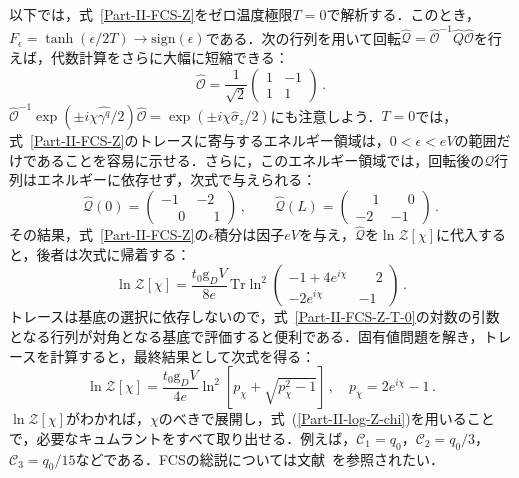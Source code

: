 \documentclass[a4paper,11pt]{ltjsarticle}
\def\Tr{\mathrm{Tr}}
\begin{document}
以下では，式~\eqref{Part-II-FCS-Z}をゼロ温度極限$T=0$で解析する．このとき，$F_{\epsilon}=\tanh(\epsilon/2T)\to \mbox{sign}(\epsilon)$である．次の行列を用いて回転$\hat{\mathcal{Q}}=\hat{\mathcal{O}}^{-1}\hat{Q}\hat{\mathcal{O}}$を行えば，代数計算をさらに大幅に短縮できる：
\begin{equation}
\hat{\mathcal{O}}=\frac{1}{\sqrt{2}}\left(\begin{array}{cr}1 & -1
\\ 1 & 1\end{array}\right)\,.
\end{equation}
$\hat{\mathcal{O}}^{-1}\exp(\pm
i\chi\hat{\gamma^{q}}/2)\hat{\mathcal{O}}=\exp(\pm
i\chi\hat{\sigma}_{z}/2)$にも注意しよう．$T=0$では，式~\eqref{Part-II-FCS-Z}のトレースに寄与するエネルギー領域は，$0<\epsilon<eV$の範囲だけであることを容易に示せる．さらに，このエネルギー領域では，回転後の$\mathcal{Q}$行列はエネルギーに依存せず，次式で与えられる：
\begin{equation}
\hat{\mathcal{Q}}(0)=\left(\begin{array}{cc}-1 & -2 \\ \phantom{-}0
& \phantom{-}1\end{array}\right)\,,\qquad
\hat{\mathcal{Q}}(L)=\left(\begin{array}{cc}\phantom{-}1 &
\phantom{-}0
\\ -2 & -1\end{array}\right)\,.
\end{equation}
その結果，式~\eqref{Part-II-FCS-Z}の$\epsilon$積分は因子$eV$を与え，$\hat{\mathcal{Q}}$を$\ln\mathcal{Z}[\chi]$に代入すると，後者は次式に帰着する：
\begin{equation}\label{Part-II-FCS-Z-T-0}
\ln\mathcal{Z}[\chi]=\frac{t_{0}\mathrm{g}_{D}V}{8e}\,\Tr
\ln^{2}\left(\begin{array}{cc} -1+4e^{i\chi} & \phantom{-}2 \\
-2e^{i\chi} & -1
\end{array}\right)\,.
\end{equation}
トレースは基底の選択に依存しないので，式~\eqref{Part-II-FCS-Z-T-0}の対数の引数となる行列が対角となる基底で評価すると便利である．固有値問題を解き，トレースを計算すると，最終結果として次式を得る：
\begin{equation}
\ln\mathcal{Z}[\chi]=\frac{t_{0}\mathrm{g}_{D}V}{4e}
\ln^{2}\left[p_{\chi}+\sqrt{p^{2}_{\chi}-1}\right]\,,\quad
p_{\chi}=2e^{i\chi}-1\,.
\end{equation}
$\ln \mathcal{Z}[\chi]$がわかれば，$\chi$のべきで展開し，式~(\ref{Part-II-log-Z-chi})を用いることで，必要なキュムラントをすべて取り出せる．例えば，$\mathcal{C}_{1}=q_{0}$，$\mathcal{C}_{2}=q_0/3$，$\mathcal{C}_{3}=q_0/15$などである．FCSの総説については文献~\cite{Levitov-FCS}を参照されたい．
\end{document}
